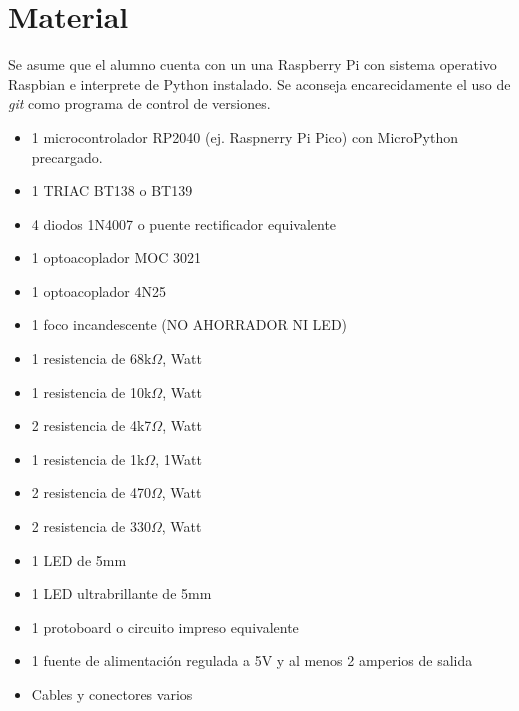 
%
%
\section{Material}%
\label{sec:material}
Se asume que el alumno cuenta con un una Raspberry Pi con sistema operativo Raspbian e interprete de Python instalado. Se aconseja encarecidamente el uso de \textit{git} como programa de control de versiones.

\begin{itemize}[noitemsep]
	\item 1 microcontrolador RP2040 (ej. Raspnerry Pi Pico) con MicroPython precargado.
	\item 1 TRIAC BT138 o BT139
	\item 4 diodos 1N4007 o puente rectificador equivalente
	\item 1 optoacoplador MOC 3021
	\item 1 optoacoplador 4N25
	\item 1 foco incandescente (NO AHORRADOR NI LED)
	\item 1 resistencia de 68k$\Omega$, Watt
	\item 1 resistencia de 10k$\Omega$, Watt
	\item 2 resistencia de 4k7$\Omega$, Watt
	\item 1 resistencia de  1k$\Omega$, 1Watt
	\item 2 resistencia de 470$\Omega$, Watt
	\item 2 resistencia de 330$\Omega$, Watt
	\item 1 LED de 5mm
	\item 1 LED ultrabrillante de 5mm
	\item 1 protoboard o circuito impreso equivalente
	\item 1 fuente de alimentación regulada a 5V y al menos 2 amperios de salida
	\item Cables y conectores varios
\end{itemize}
